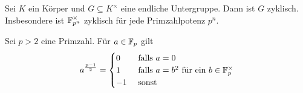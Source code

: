 \begin{theorem}
	Sei $K$ ein Körper und $G \subseteq K^{\times}$ eine endliche Untergruppe.
	Dann ist $G$ zyklisch. Insbesondere ist $\mathbb{F}_{p^{n}}^{\times}$ zyklisch für jede Primzahlpotenz $p^{n}$.
\end{theorem}


\begin{corollary}
	Sei $p > 2$ eine Primzahl. Für $a \in \mathbb{F}_{p}$ gilt 
	\[
		a^{\frac{p-1}{2}} = \begin{cases}
			0 &\text{ falls } a = 0\\
			1 &\text{ falls } a = b^{2} \text{ für ein } b \in \mathbb{F}_{p}^{\times}\\
			-1 &\text{ sonst }
		\end{cases}
	\]
\end{corollary}



































 
